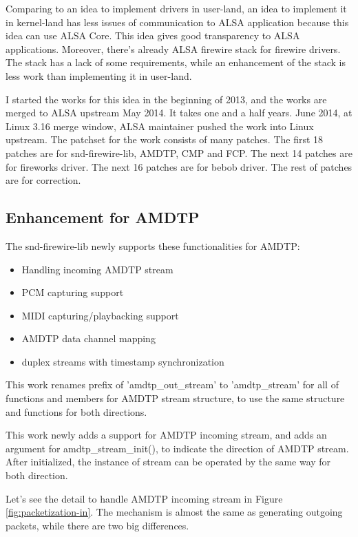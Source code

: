 \documentclass[onecolumn]{jarticle}
\begin{document}
Comparing to an idea to implement drivers in user-land, an idea to implement it in kernel-land has less issues of communication to ALSA application because this idea can use ALSA Core. This idea gives good transparency to ALSA applications. Moreover, there's already ALSA firewire stack for firewire drivers. The stack has a lack of some requirements, while an enhancement of the stack is less work than implementing it in user-land.

I started the works for this idea in the beginning of 2013, and the works are merged to ALSA upstream May 2014. It takes one and a half years. June 2014, at Linux 3.16 merge window, ALSA maintainer pushed the work into Linux upstream. The patchset for the work consists of many patches. The first 18 patches are for snd-firewire-lib, AMDTP, CMP and FCP. The next 14 patches are for fireworks driver. The next 16 patches are for bebob driver. The rest of patches are for correction.

\subsection{Enhancement for AMDTP}

The snd-firewire-lib newly supports these functionalities for AMDTP:

\begin{itemize}
	\item Handling incoming AMDTP stream
	\item PCM capturing support
	\item MIDI capturing/playbacking support
	\item AMDTP data channel mapping
	\item duplex streams with timestamp synchronization
\end{itemize}

This work renames prefix of 'amdtp\_out\_stream' to 'amdtp\_stream' for all of functions and members for AMDTP stream structure, to use the same structure and functions for both directions.

This work newly adds a support for AMDTP incoming stream, and adds an argument for amdtp\_stream\_init(), to indicate the direction of AMDTP stream. After initialized, the instance of stream can be operated by the same way for both direction.

Let's see the detail to handle AMDTP incoming stream in Figure \ref{fig:packetization-in}. The mechanism is almost the same as generating outgoing packets, while there are two big differences.
\end{document}
